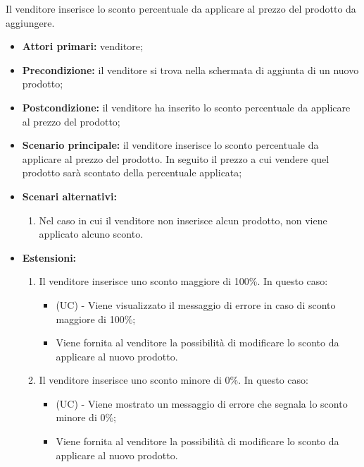 Il venditore inserisce lo sconto percentuale da applicare al prezzo del prodotto da aggiungere.
\begin{itemize}
    \item \textbf{Attori primari:} venditore;
    \item \textbf{Precondizione:} il venditore si trova nella schermata di aggiunta di un nuovo prodotto;
    \item \textbf{Postcondizione:} il venditore ha inserito lo sconto percentuale da applicare al prezzo del prodotto;
    \item \textbf{Scenario principale:} il venditore inserisce lo sconto percentuale da applicare al prezzo del prodotto. In seguito il prezzo a cui vendere quel prodotto sarà scontato della percentuale applicata;
    \item \textbf{Scenari alternativi:}
    \begin{enumerate}[label=\lett]
    	\item Nel caso in cui il venditore non inserisce alcun prodotto, non viene applicato alcuno sconto.
    \end{enumerate}
    \item \textbf{Estensioni:}
    \begin{enumerate}[label=\lett]
    	\item Il venditore inserisce uno sconto maggiore di 100\%. In questo caso:
    	\begin{itemize}
    		\item (UC) - Viene visualizzato il messaggio di errore in caso di sconto maggiore di 100\%;
    		\item Viene fornita al venditore la possibilità di modificare lo sconto da applicare al nuovo prodotto.
    	\end{itemize}
    	\item Il venditore inserisce uno sconto minore di 0\%. In questo caso:
    	\begin{itemize}
    		\item (UC) - Viene mostrato un messaggio di errore che segnala lo sconto minore di 0\%;
    		\item Viene fornita al venditore la possibilità di modificare lo sconto da applicare al nuovo prodotto.
    	\end{itemize}
    \end{enumerate}
\end{itemize}

